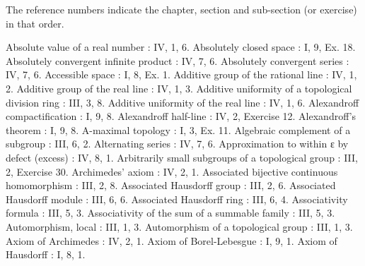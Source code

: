 
The reference numbers indicate the chapter, section and sub-section (or exercise) in that order.

Absolute value of a real number : IV, 1, 6. Absolutely closed space : I, 9, Ex. 18. Absolutely convergent infinite product : IV, 7, 6. Absolutely convergent series : IV, 7, 6. Accessible space : I, 8, Ex. 1. Additive group of the rational line : IV, 1, 2. Additive group of the real line : IV, 1, 3. Additive uniformity of a topological division ring : III, 3, 8. Additive uniformity of the real line : IV, 1, 6. Alexandroff compactification : I, 9, 8. Alexandroff half-line : IV, 2, Exercise 12. Alexandroff's theorem : I, 9, 8. A-maximal topology : I, 3, Ex. 11. Algebraic complement of a subgroup : III, 6, 2. Alternating series : IV, 7, 6. Approximation to within ε by defect (excess) : IV, 8, 1. Arbitrarily small subgroups of a topological group : III, 2, Exercise 30. Archimedes' axiom : IV, 2, 1. Associated bijective continuous homomorphism : III, 2, 8. Associated Hausdorff group : III, 2, 6. Associated Hausdorff module : III, 6, 6. Associated Hausdorff ring : III, 6, 4. Associativity formula : III, 5, 3. Associativity of the sum of a summable family : III, 5, 3. Automorphism, local : III, 1, 3. Automorphism of a topological group : III, 1, 3. Axiom of Archimedes : IV, 2, 1. Axiom of Borel-Lebesgue : I, 9, 1. Axiom of Hausdorff : I, 8, 1.


